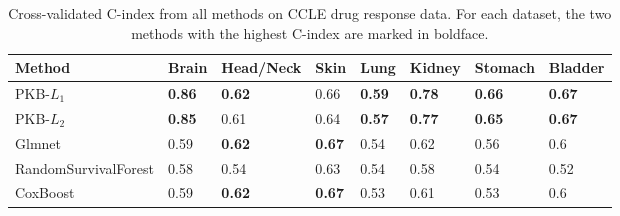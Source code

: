 \documentclass[a4paper,12pt]{article}
\begin{document}
\begin{table}[htp]
	\centering
	\begin{tabular}{llllllll}
		\hline
		Method               & Brain         & Head/Neck          & Skin      & Lung    & Kidney        & Stomach       & Bladder       \\ \hline
		PKB-$L_1$               & \textbf{0.86} & \textbf{0.62} & 0.66          & \textbf{0.59} & \textbf{0.78} & \textbf{0.66} & \textbf{0.67} \\
		PKB-$L_2$               & \textbf{0.85} & 0.61          & 0.64          & \textbf{0.57} & \textbf{0.77} & \textbf{0.65} & \textbf{0.67} \\
		Glmnet               & 0.59          & \textbf{0.62} & \textbf{0.67} & 0.54          & 0.62          & 0.56          & 0.6           \\
		RandomSurvivalForest & 0.58          & 0.54          & 0.63          & 0.54          & 0.58          & 0.54          & 0.52          \\
		CoxBoost             & 0.59          & \textbf{0.62} & \textbf{0.67} & 0.53          & 0.61          & 0.53          & 0.6           \\ \hline
	\end{tabular}
	\caption{Cross-validated C-index from all methods on CCLE drug response data. For each dataset, the two methods with the highest C-index are marked in boldface.}
	\label{tab:tcga_mean}
\end{table}
\end{document}
